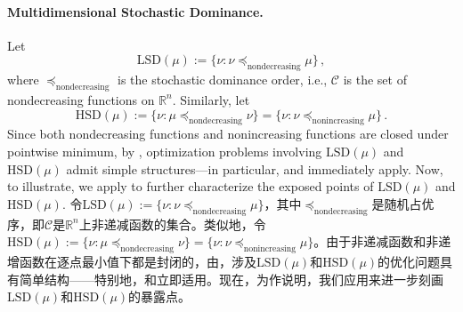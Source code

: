 \documentclass[12pt,letterpaper]{article}
\newenvironment{original}{\color{black}}{}
\newenvironment{translation}{\color{blue}}{}
\theoremstyle{plain}
\theoremstyle{definition}
\theoremstyle{remark}
\newcommand{\C}{\mathcal{C}}
\newcommand{\R}{\mathds{R}}
\theoremstyle{definition}
\begin{document}
\paragraph{Multidimensional Stochastic Dominance.}\hspace{-2mm}
\begin{original}
Let
\[\text{LSD}(\mu) := \big\{\nu: \nu \preceq_{\text{nondecreasing}} \mu\big\}\,,\]
where $\preceq_{\text{nondecreasing}}$ is the stochastic dominance order, i.e., $\C$ is the set of nondecreasing functions on $\R^n$. Similarly, let
\[\text{HSD}(\mu) := \big\{\nu:   \mu \preceq_{\text{nondecreasing}} \nu\big\} = \big\{\nu:   \nu \preceq_{\text{nonincreasing}} \mu\big\}\,.\]
Since both nondecreasing functions and nonincreasing functions are closed under pointwise minimum, by , optimization problems involving $\text{LSD}(\mu)$ and $\text{HSD}(\mu)$ admit simple structures---in particular,   and  immediately apply. Now, to illustrate, we apply  to further characterize the exposed points of $\text{LSD}(\mu)$ and $\text{HSD}(\mu)$.
\end{original}
\begin{translation}
令$\text{LSD}(\mu) := \{\nu: \nu \preceq_{\text{nondecreasing}} \mu\}$，其中$\preceq_{\text{nondecreasing}}$是随机占优序，即$\C$是$\R^n$上非递减函数的集合。类似地，令$\text{HSD}(\mu) := \{\nu: \mu \preceq_{\text{nondecreasing}} \nu\} = \{\nu: \nu \preceq_{\text{nonincreasing}} \mu\}$。由于非递减函数和非递增函数在逐点最小值下都是封闭的，由，涉及$\text{LSD}(\mu)$和$\text{HSD}(\mu)$的优化问题具有简单结构——特别地，和立即适用。现在，为作说明，我们应用来进一步刻画$\text{LSD}(\mu)$和$\text{HSD}(\mu)$的暴露点。
\end{translation}
\end{document}
